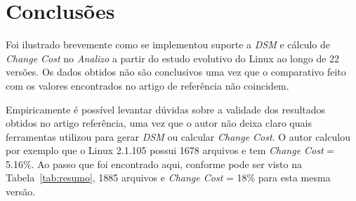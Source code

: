 \documentclass[conference]{IEEEtran}
\begin{document}
\section{Conclusões}

Foi ilustrado brevemente como se implementou suporte a {\it DSM} e cálculo de
{\it Change Cost} no {\it Analizo} a partir do estudo evolutivo do Linux
ao longo de 22 versões. Os dados obtidos não são conclusivos uma vez
que o comparativo feito com os valores encontrados no artigo de
referência\cite{ExploringStructure} não coincidem.

Empiricamente é possível levantar dúvidas sobre a validade dos resultados
obtidos no artigo referência\cite{ExploringStructure}, uma vez que o autor não
deixa claro quais ferramentas utilizou para gerar {\it DSM} ou calcular {\it
Change Cost}. O autor calculou por exemplo que o Linux 2.1.105 possui 1678
arquivos e tem {\it Change Cost} = 5.16\%. Ao passo que foi encontrado aqui,
conforme pode ser visto na Tabela~\ref{tab:resumo}, 1885 arquivos e {\it
Change Cost} = 18\% para esta mesma versão.


\end{document}
